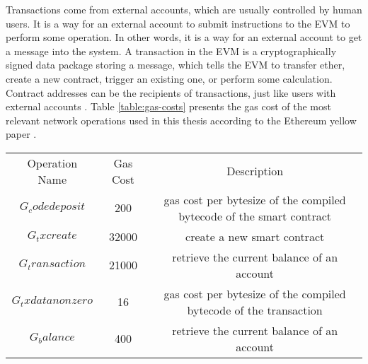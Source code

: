 Transactions come from external accounts, which are usually controlled by human users. It is a way for an external account to submit instructions to the EVM to perform some operation. In other words, it is a way for an external account to get a message into the system. A transaction in the EVM is a cryptographically signed data package storing a message, which tells the EVM to transfer ether, create a new contract, trigger an existing one, or perform some calculation. Contract addresses can be the recipients of transactions, just like users with external accounts \cite[60]{dannen2017introducing}. 
Table \ref{table:gas-costs} presents the gas cost of the most relevant network operations used in this thesis according to the Ethereum yellow paper \cite[27]{wood2014ethereum}.
\begin{center}
    \begin{tabular}{ c c c }\label{table:gas-costs}
     Operation Name & Gas Cost & Description \\ 
     $G_codedeposit$ & 200 & gas cost per bytesize of the compiled bytecode of the smart contract \\  
     $G_txcreate$ & 32000 & create a new smart contract  \\   
     $G_transaction$ & 21000 & retrieve the current balance of an account \\
     $G_txdatanonzero$ & 16 & gas cost per bytesize of the compiled bytecode of the transaction  \\   
     $G_balance$ & 400 & retrieve the current balance of an account 
    \end{tabular}
\end{center}